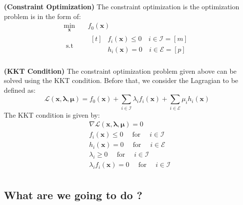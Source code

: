 \begin{definition}{\textbf{(Constraint Optimization)}}
   The constraint optimization is the optimization problem is in the form of:
   \begin{equation*}
    \begin{aligned}
        \min_{\boldsymbol x} \quad & f_0(\boldsymbol x) \\
        \text{ s.t } \quad & \begin{aligned}[t] 
            &f_i(\boldsymbol x) \le 0 \quad i \in \mathcal{I} = [m] \\
            &h_i(\boldsymbol x) = 0 \quad i \in \mathcal{E} = [p] \\
        \end{aligned}
    \end{aligned}
   \end{equation*}
\end{definition}
\begin{definition}{\textbf{(KKT Condition)}}
    The constraint optimization problem given above can be solved using the KKT condition. Before that, we consider the Lagragian to be defined as:
    \begin{equation*}
        \mathcal{L}(\boldsymbol x, \boldsymbol \lambda, \boldsymbol \mu) = f_0(\boldsymbol x) + \sum_{i\in\mathcal{I}}\lambda_i f_i(\boldsymbol x) + \sum_{i\in\mathcal{E}}\mu_i h_i(\boldsymbol x)
    \end{equation*}
    The KKT condition is given by:
    \begin{equation*}
    \begin{aligned}
        &\nabla \mathcal{L}(\boldsymbol x, \boldsymbol \lambda, \boldsymbol \mu) = 0 \\
        &f_i(\boldsymbol x) \le 0 \quad \text{ for } \quad i \in \mathcal{I} \\
        &h_i(\boldsymbol x) = 0 \quad \text{ for } \quad i \in \mathcal{E} \\
        &\lambda_i \ge 0 \quad \text{ for } \quad i \in \mathcal{I} \\
        &\lambda_if_i(\boldsymbol x) = 0 \quad \text{ for } \quad i \in \mathcal{I} \\
    \end{aligned}
    \end{equation*}
\end{definition}

\subsection{What are we going to do ?}

